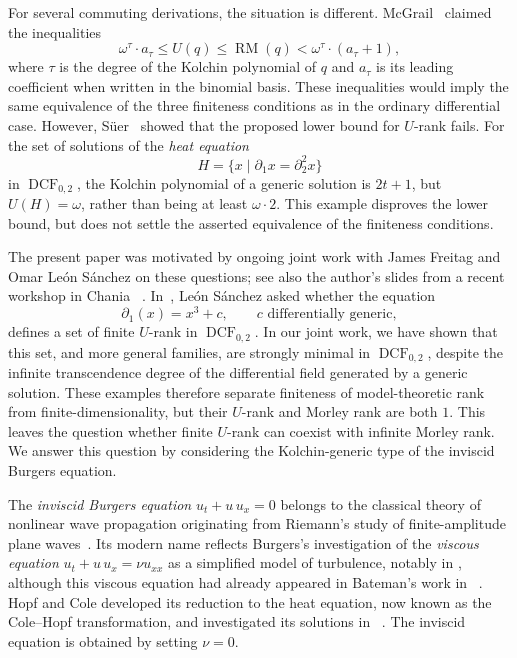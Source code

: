 \documentclass[10pt,a4paper]{amsart}
\newcommand{\DCF}{\operatorname{DCF}}
\newcommand{\RM}{\operatorname{RM}}
\begin{document}
For several commuting derivations, the situation is different.
McGrail~\cite{McGrail} claimed the inequalities
\[
 \omega^\tau\cdot a_\tau
 \leqslant U(q)
 \leqslant \RM(q)
 <\omega^\tau\cdot(a_\tau+1),
\]
where $\tau$ is the degree of the Kolchin polynomial of $q$ and
$a_\tau$ is its leading coefficient when written in the binomial
basis. These inequalities would imply the same equivalence of
the three finiteness conditions as in the ordinary differential
case. However, S\"uer~\cite{Suer} showed that the proposed lower
bound for $U$-rank fails. For the set of solutions of the \emph{heat equation}
\[
 H=\{x\mid \partial_1x=\partial_2^2x\}
\]
in $\DCF_{0,2}$, the Kolchin polynomial of a generic solution is
$2t+1$, but $U(H)=\omega$, rather than being at least
$\omega\cdot2$. This example disproves the lower bound, but does
not settle the asserted equivalence of the finiteness conditions.

The present paper was motivated by ongoing joint work with James
Freitag and Omar Le\'on S\'anchez on these questions; see also
the author's slides from a recent workshop in Chania  ~\cite{Chania}. In~\cite{LS}, Le\'on S\'anchez
asked whether the equation
\[
 \partial_1(x)=x^3+c,
 \qquad c\text{ differentially generic},
\]
defines a set of finite $U$-rank in $\DCF_{0,2}$. In our joint work,
we have shown that this set, and more general families, are
strongly minimal in $\DCF_{0,2}$, despite the infinite
transcendence degree of the differential field generated by a
generic solution. These examples therefore separate finiteness
of model-theoretic rank from finite-dimensionality, but their
$U$-rank and Morley rank are both $1$. This leaves the question
whether finite $U$-rank can coexist with infinite Morley rank. We answer this
question by considering the Kolchin-generic type of the inviscid
Burgers equation.

The \emph{inviscid Burgers equation} $u_t+u\,u_x=0$ belongs to the classical theory of nonlinear wave
propagation originating from Riemann's study of
finite-amplitude plane waves~\cite{Riemann1860}. Its modern name
reflects Burgers's investigation of the \emph{viscous equation}
$u_t+u\,u_x=\nu u_{xx}$ as a simplified model of turbulence,
notably in \cite{Burgers1948}, although this viscous
equation had already appeared in Bateman's work in
~\cite{Bateman1915}. Hopf and Cole developed
its reduction to the heat equation, now known as the Cole--Hopf
transformation, and investigated its solutions in ~\cite{Hopf1950,Cole1951}. The inviscid equation is
obtained by setting $\nu=0$.
\end{document}
